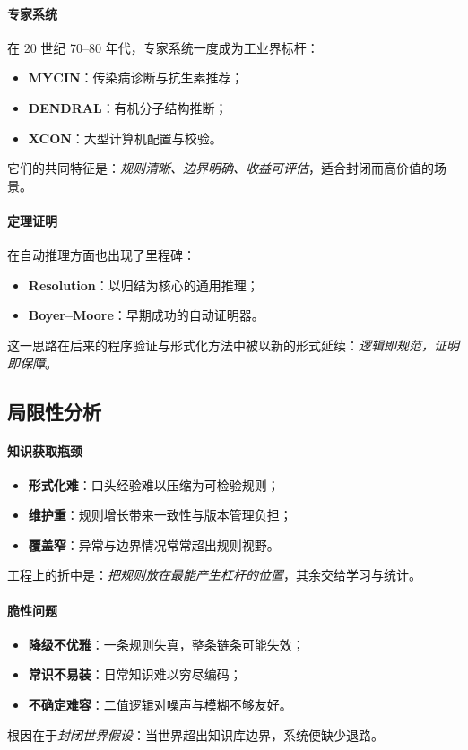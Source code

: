 \paragraph{专家系统}
在 20 世纪 70–80 年代，专家系统一度成为工业界标杆：
\begin{itemize}
\item \textbf{MYCIN}：传染病诊断与抗生素推荐；
\item \textbf{DENDRAL}：有机分子结构推断；
\item \textbf{XCON}：大型计算机配置与校验。
\end{itemize}
它们的共同特征是：\emph{规则清晰、边界明确、收益可评估}，适合封闭而高价值的场景。

\paragraph{定理证明}
在自动推理方面也出现了里程碑：
\begin{itemize}
\item \textbf{Resolution}：以归结为核心的通用推理；
\item \textbf{Boyer–Moore}：早期成功的自动证明器。
\end{itemize}
这一思路在后来的程序验证与形式化方法中被以新的形式延续：\emph{逻辑即规范，证明即保障}。

\subsection{局限性分析}

\paragraph{知识获取瓶颈}
\begin{itemize}
\item \textbf{形式化难}：口头经验难以压缩为可检验规则；
\item \textbf{维护重}：规则增长带来一致性与版本管理负担；
\item \textbf{覆盖窄}：异常与边界情况常常超出规则视野。
\end{itemize}
工程上的折中是：\emph{把规则放在最能产生杠杆的位置}，其余交给学习与统计。

\paragraph{脆性问题}
\begin{itemize}
\item \textbf{降级不优雅}：一条规则失真，整条链条可能失效；
\item \textbf{常识不易装}：日常知识难以穷尽编码；
\item \textbf{不确定难容}：二值逻辑对噪声与模糊不够友好。
\end{itemize}
根因在于\emph{封闭世界假设}：当世界超出知识库边界，系统便缺少退路。

